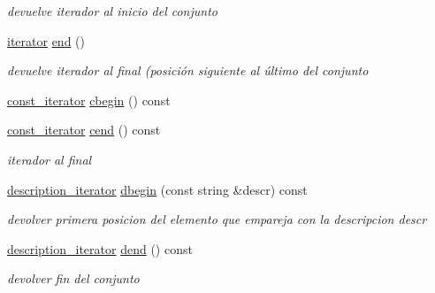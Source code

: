 \begin{DoxyCompactItemize}
\begin{DoxyCompactList}\small\item\em devuelve iterador al inicio del conjunto \end{DoxyCompactList}\item 
\hypertarget{classconjunto_adeef17ca21f1fb29f803790c89c1fc56}{\hyperlink{classconjunto_1_1iterator}{iterator} \hyperlink{classconjunto_adeef17ca21f1fb29f803790c89c1fc56}{end} ()}\label{classconjunto_adeef17ca21f1fb29f803790c89c1fc56}

\begin{DoxyCompactList}\small\item\em devuelve iterador al final (posición siguiente al último del conjunto \end{DoxyCompactList}\item 
\hyperlink{classconjunto_1_1const__iterator}{const\-\_\-iterator} \hyperlink{classconjunto_a7933f91ed5906a9545f682572cb687f6}{cbegin} () const 
\item 
\hyperlink{classconjunto_1_1const__iterator}{const\-\_\-iterator} \hyperlink{classconjunto_ab29b3d1855e631625dab94db9af9ee9c}{cend} () const 
\begin{DoxyCompactList}\small\item\em iterador al final \end{DoxyCompactList}\item 
\hyperlink{classconjunto_1_1description__iterator}{description\-\_\-iterator} \hyperlink{classconjunto_ac40bafea5d9dc529c96cf0e5977100c6}{dbegin} (const string \&descr) const 
\begin{DoxyCompactList}\small\item\em devolver primera posicion del elemento que empareja con la descripcion descr \end{DoxyCompactList}\item 
\hyperlink{classconjunto_1_1description__iterator}{description\-\_\-iterator} \hyperlink{classconjunto_aaff3013d49c52c4d3177168338725756}{dend} () const 
\begin{DoxyCompactList}\small\item\em devolver fin del conjunto \end{DoxyCompactList}\end{DoxyCompactItemize}

